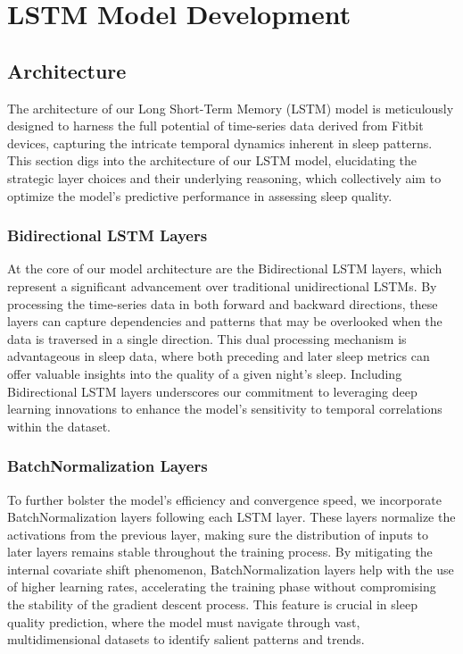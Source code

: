 \documentclass[10pt]{extarticle}
\begin{document}
\section{LSTM Model Development}

\subsection{Architecture}

The architecture of our Long Short-Term Memory (LSTM) model is meticulously designed to harness the full potential of time-series data derived from Fitbit devices, capturing the intricate temporal dynamics inherent in sleep patterns. This section digs into the architecture of our LSTM model, elucidating the strategic layer choices and their underlying reasoning, which collectively aim to optimize the model's predictive performance in assessing sleep quality.

\subsubsection{Bidirectional LSTM Layers}

At the core of our model architecture are the Bidirectional LSTM layers, which represent a significant advancement over traditional unidirectional LSTMs. By processing the time-series data in both forward and backward directions, these layers can capture dependencies and patterns that may be overlooked when the data is traversed in a single direction. This dual processing mechanism is advantageous in sleep data, where both preceding and later sleep metrics can offer valuable insights into the quality of a given night's sleep. Including Bidirectional LSTM layers underscores our commitment to leveraging deep learning innovations to enhance the model's sensitivity to temporal correlations within the dataset.

\subsubsection{BatchNormalization Layers}

To further bolster the model's efficiency and convergence speed, we incorporate BatchNormalization layers following each LSTM layer. These layers normalize the activations from the previous layer, making sure the distribution of inputs to later layers remains stable throughout the training process. By mitigating the internal covariate shift phenomenon, BatchNormalization layers help with the use of higher learning rates, accelerating the training phase without compromising the stability of the gradient descent process. This feature is crucial in sleep quality prediction, where the model must navigate through vast, multidimensional datasets to identify salient patterns and trends.
\end{document}
